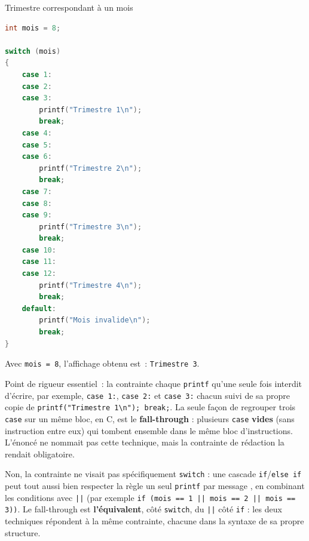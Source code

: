 \begin{UPSTIprofOnlyEnv}
    \begin{UPSTIcorrectionP}{Trimestre correspondant à un mois}
        \begin{lstlisting}[language=c]
int mois = 8;

switch (mois)
{
    case 1:
    case 2:
    case 3:
        printf("Trimestre 1\n");
        break;
    case 4:
    case 5:
    case 6:
        printf("Trimestre 2\n");
        break;
    case 7:
    case 8:
    case 9:
        printf("Trimestre 3\n");
        break;
    case 10:
    case 11:
    case 12:
        printf("Trimestre 4\n");
        break;
    default:
        printf("Mois invalide\n");
        break;
}
        \end{lstlisting}
        Avec \texttt{mois = 8}, l'affichage obtenu est~: \texttt{Trimestre 3}.

        Point de rigueur essentiel~: la contrainte \og chaque \texttt{printf} qu'une seule fois \fg{} interdit d'écrire, par exemple, \texttt{case 1:}, \texttt{case 2:} et \texttt{case 3:} chacun suivi de sa propre copie de \texttt{printf("Trimestre 1\textbackslash n"); break;}. La seule façon de regrouper trois \texttt{case} sur un même bloc, en C, est le \textbf{fall-through} : plusieurs \texttt{case} \textbf{vides} (sans instruction entre eux) qui \og tombent \fg{} ensemble dans le même bloc d'instructions. L'énoncé ne nommait pas cette technique, mais la contrainte de rédaction la rendait obligatoire.

        Non, la contrainte ne visait pas spécifiquement \texttt{switch} : une cascade \texttt{if}/\texttt{else if} peut tout aussi bien respecter la règle \og un seul \texttt{printf} par message \fg{}, en combinant les conditions avec \texttt{||} (par exemple \texttt{if (mois == 1 || mois == 2 || mois == 3))}. Le fall-through est \textbf{l'équivalent}, côté \texttt{switch}, du \texttt{||} côté \texttt{if} : les deux techniques répondent à la même contrainte, chacune dans la syntaxe de sa propre structure.
    \end{UPSTIcorrectionP}
\end{UPSTIprofOnlyEnv}
